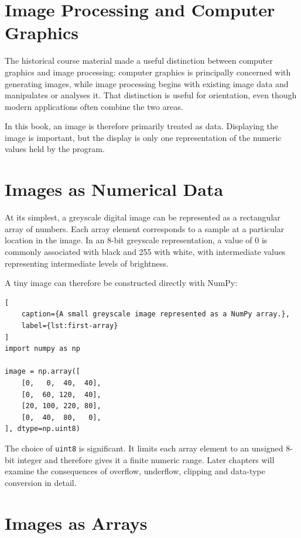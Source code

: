 \section{Image Processing and Computer Graphics}

The historical course material made a useful distinction between computer
graphics and image processing: computer graphics is principally concerned with
generating images, while image processing begins with existing image data and
manipulates or analyses it. That distinction is useful for orientation, even
though modern applications often combine the two areas.

In this book, an image is therefore primarily treated as data. Displaying the
image is important, but the display is only one representation of the numeric
values held by the program.

\section{Images as Numerical Data}

At its simplest, a greyscale digital image can be represented as a rectangular
array of numbers. Each array element corresponds to a sample at a particular
location in the image. In an 8-bit greyscale representation, a value of 0 is
commonly associated with black and 255 with white, with intermediate values
representing intermediate levels of brightness.

A tiny image can therefore be constructed directly with NumPy:

\begin{lstlisting}[
    caption={A small greyscale image represented as a NumPy array.},
    label={lst:first-array}
]
import numpy as np

image = np.array([
    [0,   0,  40,  40],
    [0,  60, 120,  40],
    [20, 100, 220, 80],
    [0,  40,  80,   0],
], dtype=np.uint8)
\end{lstlisting}

The choice of \texttt{uint8} is significant. It limits each array element to an
unsigned 8-bit integer and therefore gives it a finite numeric range. Later
chapters will examine the consequences of overflow, underflow, clipping and
data-type conversion in detail.

\section{Images as Arrays}

